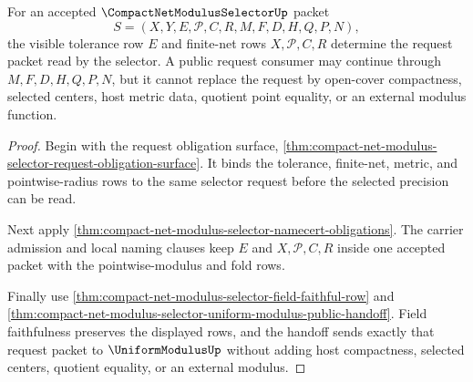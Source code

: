 \begin{theorem}
\label{thm:compact-net-modulus-selector-request-route-determinacy}
For an accepted $\CompactNetModulusSelectorUp$ packet
$$
S=(X,Y,E,\mathcal{P},C,R,M,F,D,H,Q,P,N),
$$
the visible tolerance row $E$ and finite-net rows $X,\mathcal{P},C,R$
determine the request packet read by the selector. A public request consumer
may continue through $M,F,D,H,Q,P,N$, but it cannot replace the request by
open-cover compactness, selected centers, host metric data, quotient point
equality, or an external modulus function.
\end{theorem}
\begin{proof}
Begin with the request obligation surface,
\autoref{thm:compact-net-modulus-selector-request-obligation-surface}. It binds
the tolerance, finite-net, metric, and pointwise-radius rows to the same
selector request before the selected precision can be read.

Next apply \autoref{thm:compact-net-modulus-selector-namecert-obligations}.
The carrier admission and local naming clauses keep $E$ and
$X,\mathcal{P},C,R$ inside one accepted packet with the pointwise-modulus and
fold rows.

Finally use \autoref{thm:compact-net-modulus-selector-field-faithful-row} and
\autoref{thm:compact-net-modulus-selector-uniform-modulus-public-handoff}. Field
faithfulness preserves the displayed rows, and the handoff sends exactly that
request packet to $\UniformModulusUp$ without adding host compactness, selected
centers, quotient equality, or an external modulus.
\end{proof}

